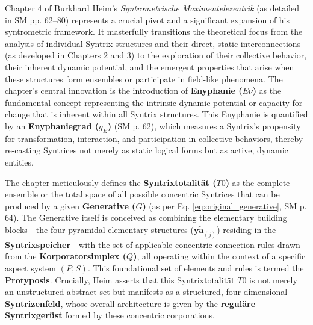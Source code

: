 \documentclass[12pt]{article}
\newcommand{\aspektivsystem}{P}
\newcommand{\subjektiveraspekt}{S}
\newcommand{\elementarstruktur}{\bm{y\widetilde{a}}_{(j)}}
\newcommand{\enyphaniegrad}{g_E}
\newcommand{\syntrixtotalitaet}{T0}
\newcommand{\generative}{G}
\begin{document}
Chapter 4 of Burkhard Heim's \textit{Syntrometrische Maximentelezentrik} (as detailed in SM pp. 62–80) represents a crucial pivot and a significant expansion of his syntrometric framework. It masterfully transitions the theoretical focus from the analysis of individual Syntrix structures and their direct, static interconnections (as developed in Chapters 2 and 3) to the exploration of their collective behavior, their inherent dynamic potential, and the emergent properties that arise when these structures form ensembles or participate in field-like phenomena. The chapter's central innovation is the introduction of \textbf{Enyphanie (\(E\nu\))} as the fundamental concept representing the intrinsic dynamic potential or capacity for change that is inherent within all Syntrix structures. This Enyphanie is quantified by an \textbf{Enyphaniegrad (\(\enyphaniegrad\))} (SM p. 62), which measures a Syntrix's propensity for transformation, interaction, and participation in collective behaviors, thereby re-casting Syntrices not merely as static logical forms but as active, dynamic entities.

The chapter meticulously defines the \textbf{Syntrixtotalität (\(\syntrixtotalitaet\))} as the complete ensemble or the total space of all possible concentric Syntrices that can be produced by a given \textbf{Generative (\(\generative\))} (as per Eq. \eqref{eq:original_generative}, SM p. 64). The Generative itself is conceived as combining the elementary building blocks—the four pyramidal elementary structures (\( \elementarstruktur \)) residing in the \textbf{Syntrixspeicher}—with the set of applicable concentric connection rules drawn from the \textbf{Korporatorsimplex (\( Q \))}, all operating within the context of a specific aspect system \((\aspektivsystem,\subjektiveraspekt)\). This foundational set of elements and rules is termed the \textbf{Protyposis}. Crucially, Heim asserts that this Syntrixtotalität \( \syntrixtotalitaet \) is not merely an unstructured abstract set but manifests as a structured, four-dimensional \textbf{Syntrizenfeld}, whose overall architecture is given by the \textbf{reguläre Syntrixgerüst} formed by these concentric corporations.
\end{document}
